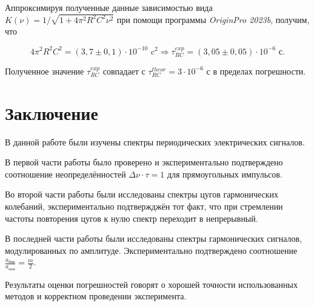 \documentclass[a4paper, 12pt]{article}
\begin{document}
     Аппроксимируя полученные данные зависимостью вида $K(\nu) = 1/\sqrt{1 + 4 \pi^2 R^2 C^2 \nu^2}$ при помощи программы \textit{OriginPro 2023b}, получим, что

     \begin{equation*}
         4 \pi^2 R^2C^2 = \left( 3,7 \pm 0,1 \right) \cdot 10^{-10} \text{ c}^2 \Rightarrow \tau_{RC}^{exp} = \left( 3,05 \pm 0,05 \right) \cdot 10^{-6} \text{ с}.
     \end{equation*}

     Полученное значение $\tau_{RC}^{exp}$ совпадает с $\tau_{RC}^{theor} = 3 \cdot 10^{-6}$ с в пределах погрешности.

    \section{Заключение}

    В данной работе были изучены спектры периодических электрических сигналов.
    
    В первой части работы было проверено и экспериментально подтверждено соотношение неопределённостей $\Delta\nu \cdot \tau = 1$ для прямоугольных импульсов.

    Во второй части работы были исследованы спектры цугов гармонических колебаний, экспериментально подтвержджён тот факт, что при стремлении частоты повторения цугов к нулю спектр переходит в непрерывный.

    В последней части работы были исследованы спектры гармонических сигналов, модулированных по амплитуде. Экспериментально подтверждено соотношение $\frac{a_{\text{бок}}}{a_{\text{осн}}}=\frac{m}{2}$.

    Результаты оценки погрешностей говорят о хорошей точности использованных методов и корректном проведении эксперимента.
\end{document}
